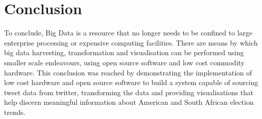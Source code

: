 \documentclass[12pt]{article} %
\begin{document}
	
	
	
	
	
	
	\section{Conclusion} %
	
	To conclude, Big Data is a resource that no longer needs to be confined to large enterprise processing or expensive computing facilities. There are means by which big data harvesting, transformation and visualisation can be performed using smaller scale endeavours, using open source software and low cost commodity hardware. This conclusion was reached by demonstrating the implementation of low cost hardware and open source software to build a system capable of sourcing tweet data from twitter, transforming the data and providing visualisations that help discern meaningful information about American and South African election trends.
	
	\newpage
	
	
\end{document}
